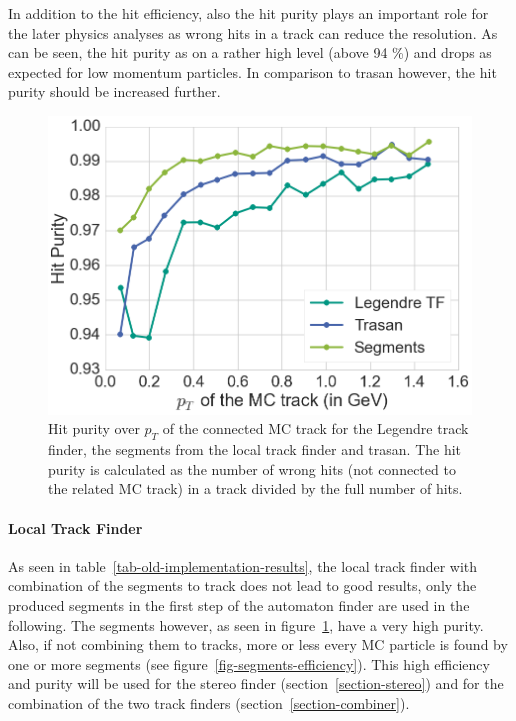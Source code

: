 In addition to the hit efficiency, also the hit purity plays an important role for the later physics analyses as wrong hits in a track can reduce the resolution. As can be seen, the hit purity as on a rather high level (above 94 \%) and drops as expected for low momentum particles. In comparison to trasan however, the hit purity should be increased further.

\begin{figure}
  \centering
  \includegraphics[width=0.7\linewidth]{figures/workflow/segment_purity.png}
  \caption{Hit purity over $p_T$ of the connected MC track for the Legendre track finder, the segments from the local track finder and trasan. The hit purity is calculated as the number of wrong hits (not connected to the related MC track) in a track divided by the full number of hits.}
  \label{fig-legendre-purity}
\end{figure}


\paragraph{Local Track Finder}

As seen in table~\ref{tab-old-implementation-results}, the local track finder with combination of the segments to track does not lead to good results, only the produced segments in the first step of the automaton finder are used in the following. The segments however, as seen in figure~\ref{fig-legendre-purity}, have a very high purity. Also, if not combining them to tracks, more or less every MC particle is found by one or more segments (see figure~\ref{fig-segments-efficiency}). This high efficiency and purity will be used for the stereo finder (section~\ref{section-stereo}) and for the combination of the two track finders (section~\ref{section-combiner}).

